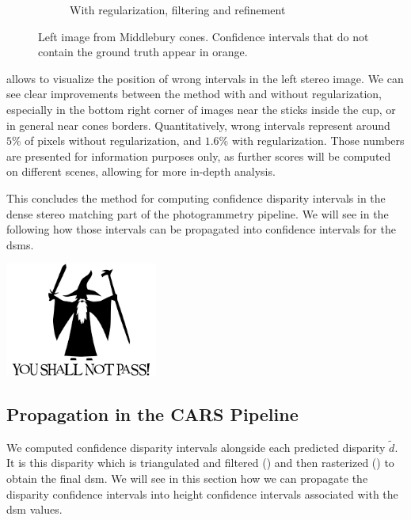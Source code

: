 \begin{figure}
\begin{subfigure}[t]{0.49\linewidth}
        \caption{With regularization, filtering and refinement}
        \label{fig:comparison_wrong_intervals_reg}
    \end{subfigure}
    \caption{Left image from Middlebury cones. Confidence intervals that do not contain the ground truth appear in orange.}
    \label{fig:comparison_wrong_intervals}
\end{figure}

 allows to visualize the position of wrong intervals in the left stereo image. We can see clear improvements between the method with and without regularization, especially in the bottom right corner of images near the sticks inside the cup, or in general near cones borders. Quantitatively, wrong intervals represent around $5\%$ of pixels without regularization, and $1.6\%$ with regularization. Those numbers are presented for information purposes only, as further scores will be computed on different scenes, allowing for more in-depth analysis.

This concludes the method for computing confidence disparity intervals in the dense stereo matching part of the photogrammetry pipeline. We will see in the following how those intervals can be propagated into confidence intervals for the \acrshort{dsm}s.

\marquepage
{}
\begin{center}
    \includegraphics[width=5cm]{tmp/gandalf.png}
\end{center}

\subsection{Propagation in the CARS Pipeline}
We computed confidence disparity intervals alongside each predicted disparity $\tilde{d}$. It is this disparity which is triangulated and filtered () and then rasterized () to obtain the final \acrshort{dsm}. We will see in this section how we can propagate the disparity confidence intervals into height confidence intervals associated with the \acrshort{dsm} values.

